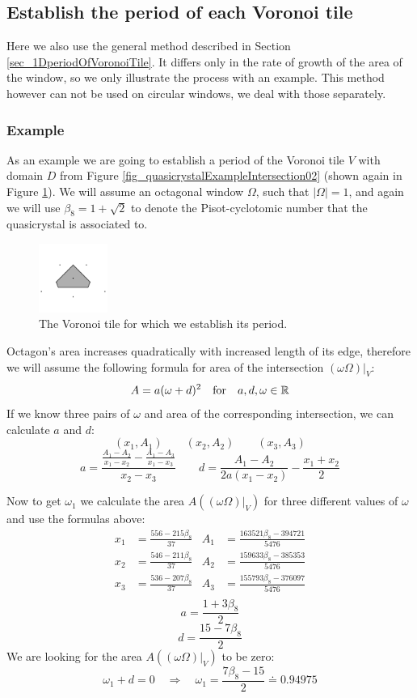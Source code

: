 \documentclass[text.tex]{subfiles}
\begin{document}
\subsection{Establish the period of each Voronoi tile}
Here we also use the general method described in Section \ref{sec_1DperiodOfVoronoiTile}. It differs only in the rate of growth of the area of the window, so we only illustrate the process with an example. This method however can not be used on circular windows, we deal with those separately. 
\subsubsection{Example}
As an example we are going to establish a period of the Voronoi tile $V$ with domain $D$ from Figure \ref{fig_quasicrystalExampleIntersection02} (shown again in Figure \ref{fig_example2D_tile}). We will assume an octagonal window $\Omega$, such that $|\Omega| = 1$, and again we will use $\beta_8 = 1+\sqrt{2}$ to denote the Pisot-cyclotomic number that the quasicrystal is associated to. 

\begin{figure}[h!]
\centering
\includegraphics[width=0.2\textwidth]{img/2D/intersectionTile03}
\caption{The Voronoi tile for which we establish its period. }
\label{fig_example2D_tile}
\end{figure}

Octagon's area increases quadratically with increased length of its edge, therefore we will assume the following formula for area of the intersection $(\omega\Omega)|_V$: 
$$A = a(\omega+d)^2 \quad\text{for}\quad a,d,\omega\in\mathbb{R}$$
If we know three pairs of $\omega$ and area of the corresponding intersection, we can calculate $a$ and $d$:
$$(x_1,A_1) \qquad (x_2,A_2) \qquad (x_3,A_3)$$
$$a = \frac{\frac{A_1-A_2}{x_1-x_2}-\frac{A_1-A_3}{x_1-x_3}}{x_2-x_3} \qquad d=\frac{A_1-A_2}{2a(x_1-x_2)}-\frac{x_1+x_2}{2}$$

Now to get $\omega_1$ we calculate the area $A((\omega\Omega)|_V)$ for three different values of $\omega$ and use the formulas above: 
\begin{align*}
x_1&=\frac{556-215\beta_8}{37} & A_1&=\frac{163521\beta_8-394721}{5476} \\
x_2&=\frac{546-211\beta_8}{37} & A_2&=\frac{159633\beta_8-385353}{5476} \\
x_3&=\frac{536-207\beta_8}{37} & A_3&=\frac{155793\beta_8-376097}{5476} \\
\end{align*}
$$a = \frac{1+3\beta_8}{2}$$
$$d = \frac{15-7\beta_8}{2}$$
We are looking for the area $A((\omega\Omega)|_V)$ to be zero:
$$\omega_1+d=0\quad\Rightarrow\quad \omega_1 = \frac{7\beta_8-15}{2}\doteq 0.94975$$
\end{document}

